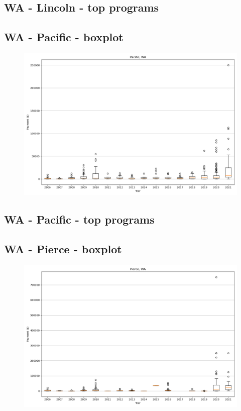 \subsection*{WA - Lincoln - top programs}

\newpage
\subsection*{WA - Pacific - boxplot}
\begin{figure}[h]
\centering
\includegraphics[width=7in]{../output/boxplots/counties/Pacific-WA_boxplot.png}
\end{figure}


\subsection*{WA - Pacific - top programs}

\newpage
\subsection*{WA - Pierce - boxplot}
\begin{figure}[h]
\centering
\includegraphics[width=7in]{../output/boxplots/counties/Pierce-WA_boxplot.png}
\end{figure}


